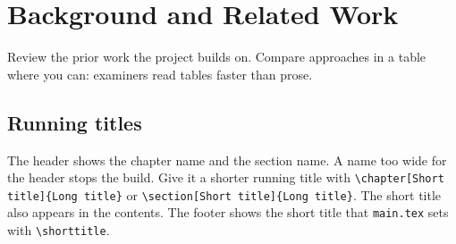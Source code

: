 \chapter{Background and Related Work}
Review the prior work the project builds on. Compare approaches in a
table where you can: examiners read tables faster than prose.

\section{Running titles}
The header shows the chapter name and the section name. A name too wide for the header stops the build. Give it a shorter running title with \texttt{\textbackslash chapter[Short title]\{Long title\}} or \texttt{\textbackslash section[Short title]\{Long title\}}. The short title also appears in the contents. The footer shows the short title that \texttt{main.tex} sets with \texttt{\textbackslash shorttitle}.
